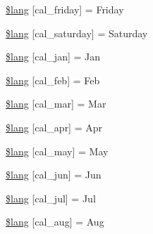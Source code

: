 \begin{DoxyCompactItemize}
\item 
\hyperlink{_admin_2system_2language_2english_2calendar__lang_8php_a5be751a9260fe00120263d6e1f41de8c}{\$lang} \mbox{[}\textquotesingle{}cal\+\_\+friday\textquotesingle{}\mbox{]} = \textquotesingle{}Friday\textquotesingle{}
\item 
\hyperlink{_admin_2system_2language_2english_2calendar__lang_8php_aff3fc79a60ccf1f09bfe1f4387105c4b}{\$lang} \mbox{[}\textquotesingle{}cal\+\_\+saturday\textquotesingle{}\mbox{]} = \textquotesingle{}Saturday\textquotesingle{}
\item 
\hyperlink{_admin_2system_2language_2english_2calendar__lang_8php_a830b34d4425cdab2632056ef2860de62}{\$lang} \mbox{[}\textquotesingle{}cal\+\_\+jan\textquotesingle{}\mbox{]} = \textquotesingle{}Jan\textquotesingle{}
\item 
\hyperlink{_admin_2system_2language_2english_2calendar__lang_8php_ac26ad55691325913e5d0f7156c95ff18}{\$lang} \mbox{[}\textquotesingle{}cal\+\_\+feb\textquotesingle{}\mbox{]} = \textquotesingle{}Feb\textquotesingle{}
\item 
\hyperlink{_admin_2system_2language_2english_2calendar__lang_8php_a22ee24632deb286ad4efb833e2fe7533}{\$lang} \mbox{[}\textquotesingle{}cal\+\_\+mar\textquotesingle{}\mbox{]} = \textquotesingle{}Mar\textquotesingle{}
\item 
\hyperlink{_admin_2system_2language_2english_2calendar__lang_8php_a61653bb502ac4775a4186ae145e9ff78}{\$lang} \mbox{[}\textquotesingle{}cal\+\_\+apr\textquotesingle{}\mbox{]} = \textquotesingle{}Apr\textquotesingle{}
\item 
\hyperlink{_admin_2system_2language_2english_2calendar__lang_8php_a7e77a974617dd3fd0ab8d66f59125fdb}{\$lang} \mbox{[}\textquotesingle{}cal\+\_\+may\textquotesingle{}\mbox{]} = \textquotesingle{}May\textquotesingle{}
\item 
\hyperlink{_admin_2system_2language_2english_2calendar__lang_8php_aabea2be5e0612f96b8d388183c4a3ebb}{\$lang} \mbox{[}\textquotesingle{}cal\+\_\+jun\textquotesingle{}\mbox{]} = \textquotesingle{}Jun\textquotesingle{}
\item 
\hyperlink{_admin_2system_2language_2english_2calendar__lang_8php_a65585e0f8fda86a900ced005f0bb3c16}{\$lang} \mbox{[}\textquotesingle{}cal\+\_\+jul\textquotesingle{}\mbox{]} = \textquotesingle{}Jul\textquotesingle{}
\item 
\hyperlink{_admin_2system_2language_2english_2calendar__lang_8php_ab7a387970f84455d8f289020761aeb83}{\$lang} \mbox{[}\textquotesingle{}cal\+\_\+aug\textquotesingle{}\mbox{]} = \textquotesingle{}Aug\textquotesingle{}

\end{DoxyCompactItemize}
